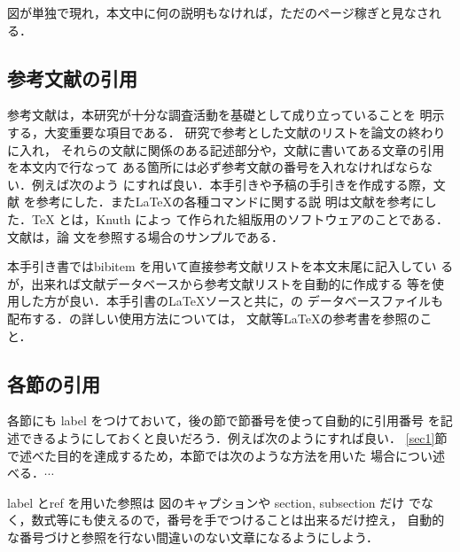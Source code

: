 図が単独で現れ，本文中に何の説明もなければ，ただのページ稼ぎと見なされ
る．

\subsection{参考文献の引用}
参考文献は，本研究が十分な調査活動を基礎として成り立っていることを
明示する，大変重要な項目である．
研究で参考とした文献のリストを論文の終わりに入れ，
それらの文献に関係のある記述部分や，文献に書いてある文章の引用を本文内で行なって
ある箇所には必ず参考文献の番号を入れなければならない．例えば次のよう
にすれば良い．本手引きや予稿の手引きを作成する際，文献
\cite{kinosita}を参考にした．また\LaTeX の各種コマンドに関する説
明は文献\cite{okumura}を参考にした．\TeX \cite{knuth} とは，Knuth によっ
て作られた組版用のソフトウェアのことである．文献\cite{labelName}は，論
文を参照する場合のサンプルである．



本手引き書ではbibitem を用いて直接参考文献リストを本文末尾に記入してい
るが，出来れば文献データベースから参考文献リストを自動的に作成する
\BibTeX 等を使用した方が良い．本手引書の\LaTeX ソースと共に，\BibTeX の
データベースファイルも配布する．\BibTeX の詳しい使用方法については，
文献\cite{okumura}等\LaTeX の参考書を参照のこと．

\subsection{各節の引用}
各節にも label をつけておいて，後の節で節番号を使って自動的に引用番号
を記述できるようにしておくと良いだろう．例えば次のようにすれば良い．
\ref{sec1}節で述べた目的を達成するため，本節では次のような方法を用いた
場合につい述べる．$\cdots$

label とref を用いた参照は 図のキャプションや section, subsection だけ
でなく，数式等にも使えるので，番号を手でつけることは出来るだけ控え，
自動的な番号づけと参照を行ない間違いのない文章になるようにしよう．